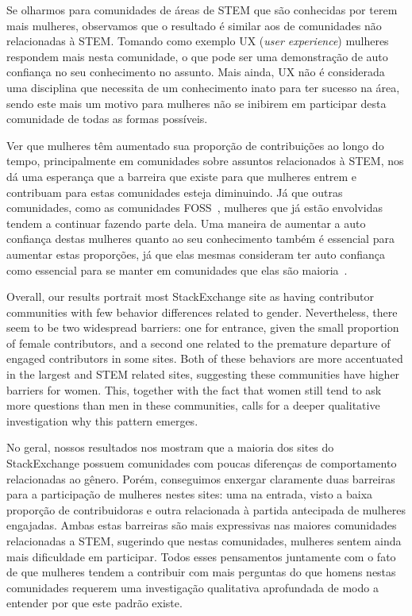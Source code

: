 Se olharmos para comunidades de áreas de STEM que são conhecidas por terem mais mulheres, observamos que o resultado é similar aos de comunidades não relacionadas à STEM. Tomando como exemplo UX (\textit{user experience}) mulheres respondem mais nesta comunidade, o que pode ser uma demonstração de auto confiança no seu conhecimento no assunto. Mais ainda, UX não é considerada uma disciplina que necessita de um conhecimento inato para ter sucesso na área, sendo este mais um motivo para mulheres não se inibirem em participar desta comunidade de todas as formas possíveis. 

Ver que mulheres têm aumentado sua proporção de contribuições ao longo do tempo, principalmente em comunidades sobre assuntos relacionados à STEM, nos dá uma esperança que a barreira que existe para que mulheres entrem e contribuam para estas comunidades esteja diminuindo. Já que outras comunidades, como as comunidades FOSS~\cite{powell2010gender}, mulheres que já estão envolvidas tendem a continuar fazendo parte dela. Uma maneira de aumentar a auto confiança destas mulheres quanto ao seu conhecimento também é essencial para aumentar estas proporções, já que elas mesmas consideram ter auto confiança como essencial para se manter em comunidades que elas são maioria~\cite{powell2010gender}.

Overall, our results portrait most StackExchange site as having contributor communities with few behavior differences related to gender. Nevertheless, there seem to be two widespread barriers: one for entrance, given the small proportion of female contributors, and a second one related to the premature departure of engaged contributors in some sites. Both of these behaviors are more accentuated in the largest and STEM related sites, suggesting these communities have higher barriers for women. This, together with the fact that women still tend to ask more questions than men in these communities, calls for a deeper qualitative investigation why this pattern emerges.

No geral, nossos resultados nos mostram que a maioria dos sites do StackExchange possuem comunidades com poucas diferenças de comportamento relacionadas ao gênero. Porém, conseguimos enxergar claramente duas barreiras para a participação de mulheres nestes sites: uma na entrada, visto a baixa proporção de contribuidoras e outra relacionada à partida antecipada de mulheres engajadas. Ambas estas barreiras são mais expressivas nas maiores comunidades relacionadas a STEM, sugerindo que nestas comunidades, mulheres sentem ainda mais dificuldade em participar. Todos esses pensamentos juntamente com o fato de que mulheres tendem a contribuir com mais perguntas do que homens nestas comunidades requerem uma investigação qualitativa aprofundada de modo a entender por que este padrão existe.


